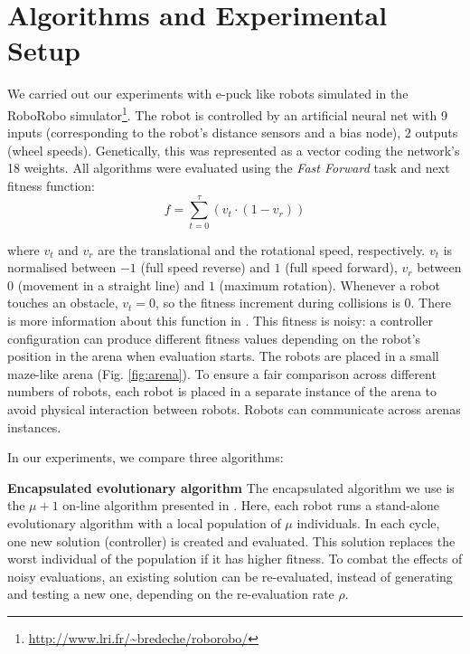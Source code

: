 \documentclass[runningheads]{llncs}
\begin{document}
\section{Algorithms and Experimental Setup}

We carried out our experiments with e-puck like robots simulated in the RoboRobo simulator\footnote{\url{http://www.lri.fr/~bredeche/roborobo/}}. The robot is controlled by an artificial neural net with 9 inputs (corresponding to the robot's distance sensors and a bias node), 2 outputs (wheel speeds). Genetically, this was represented as a vector coding the network's 18 weights. 
All algorithms were evaluated using the {\em Fast Forward} task and next fitness function: 
\vspace{-7pt}
\begin{equation}
\label{eq:fastfwd}
f = \sum_{t=0}^{\tau} (v_{t} \cdot (1 - v_{r}) )
\end{equation}
\vspace{-2pt} 

\noindent where $v_{t}$ and $v_{r}$ are the translational and the rotational speed, respectively. $v_t$ is normalised between $-1$ (full speed reverse) and $1$ (full speed forward), $v_r$ between $0$ (movement in a straight line) and $1$ (maximum rotation). Whenever a robot touches an obstacle, $v_t = 0$, so the fitness increment during collisions is 0. There is more information about this function in \cite{HUIJSMAN11}. This fitness is noisy: a controller configuration can produce different fitness values depending on the robot's position in the arena when evaluation starts. 
The robots are placed in a small maze-like arena
(Fig. \ref{fig:arena}). %
To ensure a fair comparison across different numbers of robots, each robot is placed in a separate instance of the arena to avoid physical interaction between robots. Robots can communicate across arenas instances.

In our experiments, we compare three algorithms:

{\bf Encapsulated evolutionary algorithm}
The encapsulated algorithm we use is the $\mu+1$ on-line algorithm presented in \cite{Haasdijk2010On-line-evoluti}. Here, each robot runs a stand-alone evolutionary algorithm with a local population of $\mu$ individuals. In each cycle, one new solution (controller) is created and evaluated. This solution replaces the worst individual of the population if it has higher fitness. To combat the effects of noisy evaluations, an existing solution can be re-evaluated, instead of generating and testing a new one, depending on the re-evaluation rate $\rho$. %
\end{document}
